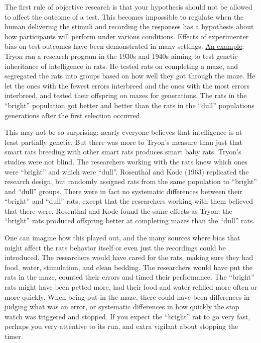 \documentclass[12pt,]{book}
\theoremstyle{definition}
\theoremstyle{definition}
\theoremstyle{definition}
\theoremstyle{remark}
\begin{document}
The first rule of objective research is that your hypothesis should not
be allowed to affect the outcome of a test. This becomes impossible to
regulate when the human delivering the stimuli and recording the
responses has a hypothesis about how participants will perform under
various conditions. Effects of experimenter bias on test outcomes have
been demonstrated in many settings.
\href{https://en.wikipedia.org/wiki/Tryon\%27s_Rat_Experiment}{An
example}: Tryon ran a research program in the 1930s and 1940s aiming to
test genetic inheritance of intelligence in rats. He tested rats on
completing a maze, and segregated the rats into groups based on how well
they got through the maze. He let the ones with the fewest errors
interbreed and the ones with the most errors interbreed, and tested
their offspring on mazes for generations. The rats in the ``bright''
population got better and better than the rats in the ``dull''
populations generations after the first selection occurred.

This may not be so surprising: nearly everyone believes that
intelligence is at least partially genetic. But there was more to
Tryon's measure than just that smart rats breeding with other smart rats
produces smart baby rats. Tryon's studies were not blind. The
researchers working with the rats knew which ones were ``bright'' and
which were ``dull''. Rosenthal and Kode (1963) replicated the research
design, but randomly assigned rats from the same population to
``bright'' and ``dull'' groups. There were in fact no systematic
differences between their ``bright'' and ``dull'' rats, except that the
researchers working with them believed that there were. Rosenthal and
Kode found the same effects as Tryon: the ``bright'' rats produced
offspring better at completing mazes than the ``dull'' rats.

One can imagine how this played out, and the many sources where bias
that might affect the rats behavior itself or even just the recordings
could be introduced. The researchers would have cared for the rats,
making sure they had food, water, stimulation, and clean bedding. The
researchers would have put the rats in the maze, counted their errors
and timed their performance. The ``bright'' rats might have been petted
more, had their food and water refilled more often or more quickly. When
being put in the maze, there could have been differences in judging what
was an error, or systematic differences in how quickly the stop watch
was triggered and stopped. If you expect the ``bright'' rat to go very
fast, perhaps you very attentive to its run, and extra vigilant about
stopping the timer.
\end{document}
